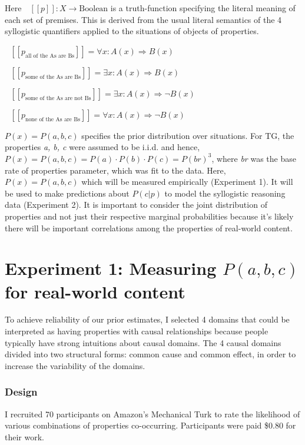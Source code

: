 \documentclass{llncs} %
\newcommand{\denote}[1]{\mbox{ $[\![ #1 ]\!]$}}
\begin{document}
Here $\denote{p}: X \rightarrow \text{Boolean}$ is a truth-function specifying the literal meaning of each set of premises. This is derived from the 
usual literal semantics of the 4 syllogistic quantifiers applied to the situations of objects of properties. 

$\denote{p_{\textrm{all of the As are Bs}}}=\forall{x}: A(x) \Rightarrow B(x)$

$\denote{p_{\textrm{some of the As are Bs}}}= \exists{x}: A(x) \Rightarrow B(x)$

$\denote{p_{\textrm{some of the As are not Bs}}}= \exists{x}: A(x) \Rightarrow \neg{B(x)}$

$\denote{p_{\textrm{none of the As are Bs}}}= \forall{x}: A(x) \Rightarrow \neg{B(x)}$

$P(x) = P(a,b,c)$ specifies the prior distribution over situations. For TG, the properties \emph{a, b, c} were assumed to be i.i.d. and hence, $P(x) = P(a, b, c) = P(a)\cdot P(b)\cdot P(c) = P(br)^3$, where \emph{br} was the base rate of properties parameter, which was fit to the data. Here, $P(x) = P(a, b, c)$ which will be measured empirically (Experiment 1). It will be used to make predictions about $P(c|p)$ to model the syllogistic reasoning data (Experiment 2). It is important to consider the joint distribution of properties and not just their respective marginal probabilities because it's likely there will be important correlations among the properties of real-world content.



\section{Experiment 1: Measuring $P(a, b, c)$ for real-world content}
\label{prelicit}

To achieve reliability of our prior estimates, I selected 4 domains that could be interpreted as having properties with causal relationships because people typically have strong intuitions about causal domains. The 4 causal domains divided into two structural forms: common cause and common effect, in order to increase the variability of the domains. 

\subsubsection{Design}

I recruited 70 participants on Amazon's Mechanical Turk to rate the likelihood of various combinations of properties co-occurring. Participants were paid \$0.80 for their work.
\end{document}
